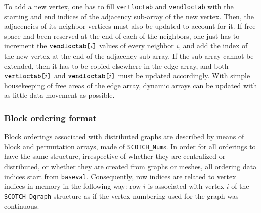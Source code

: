 To add a new vertex, one has to fill {\tt vert\lbt loc\lbt tab} and {\tt vend\lbt loc\lbt tab}
with the starting and end indices of the adjacency sub-array of the
new vertex. Then, the adjacencies of its neighbor vertices must also
be updated to account for it. If free space had been reserved at the
end of each of the neighbors, one just has to increment the
${\tt vend\lbt loc\lbt tab}\mbox{\tt [}i\mbox{\tt ]}$ values of every
neighbor $i$, and add the index of the new vertex at the end of the
adjacency sub-array. If the sub-array cannot be extended, then it has
to be copied elsewhere in the edge array, and both ${\tt vert\lbt
loc\lbt tab}\mbox{\tt [}i\mbox{\tt ]}$ and ${\tt vend\lbt loc\lbt
tab}\mbox{\tt [}i\mbox{\tt ]}$ must be updated accordingly. With
simple housekeeping of free areas of the edge array, dynamic arrays
can be updated with as little data movement as possible.

\subsubsection{Block ordering format}
\label{sec-lib-format-order}

Block orderings associated with distributed graphs are described by
means of block and permutation arrays, made of {\tt SCOTCH\_Num}s.  In
order for all orderings to have the same structure, irrespective of
whether they are centralized or distributed, or whether they are
created from graphs or meshes, all ordering data indices start from
{\tt baseval}. Consequently, row indices are related to vertex
indices in memory in the following way: row $i$ is associated with
vertex $i$ of the {\tt SCOTCH\_\lbt Dgraph} structure as if the vertex
numbering used for the graph was continuous.

